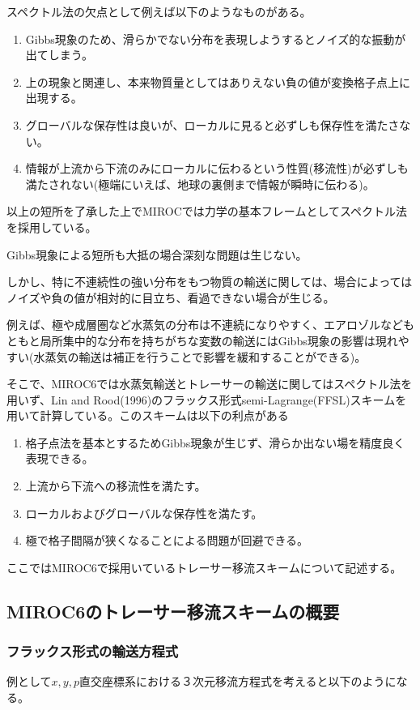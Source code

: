 \documentclass{jsbook}
\begin{document}
スペクトル法の欠点として例えば以下のようなものがある。
\begin{enumerate}
\item Gibbs現象のため、滑らかでない分布を表現しようするとノイズ的な振動が出てしまう。
\item 上の現象と関連し、本来物質量としてはありえない負の値が変換格子点上に出現する。
\item グローバルな保存性は良いが、ローカルに見ると必ずしも保存性を満たさない。
\item 情報が上流から下流のみにローカルに伝わるという性質(移流性)が必ずしも満たされない(極端にいえば、地球の裏側まで情報が瞬時に伝わる)。
\end{enumerate}
以上の短所を了承した上でMIROCでは力学の基本フレームとしてスペクトル法を採用している。

Gibbs現象による短所も大抵の場合深刻な問題は生じない。

しかし、特に不連続性の強い分布をもつ物質の輸送に関しては、場合によってはノイズや負の値が相対的に目立ち、看過できない場合が生じる。

例えば、極や成層圏など水蒸気の分布は不連続になりやすく、エアロゾルなどもともと局所集中的な分布を持ちがちな変数の輸送にはGibbs現象の影響は現れやすい(水蒸気の輸送は補正を行うことで影響を緩和することができる)。

そこで、MIROC6では水蒸気輸送とトレーサーの輸送に関してはスペクトル法を用いず、Lin and Rood(1996)のフラックス形式semi-Lagrange(FFSL)スキームを用いて計算している。このスキームは以下の利点がある
\begin{enumerate}
\item 格子点法を基本とするためGibbs現象が生じず、滑らか出ない場を精度良く表現できる。
\item 上流から下流への移流性を満たす。
\item ローカルおよびグローバルな保存性を満たす。
\item 極で格子間隔が狭くなることによる問題が回避できる。
\end{enumerate}
ここではMIROC6で採用いているトレーサー移流スキームについて記述する。

\subsection{MIROC6のトレーサー移流スキームの概要}
\subsubsection{フラックス形式の輸送方程式}
例として$x,y,p$直交座標系における３次元移流方程式を考えると以下のようになる。
\end{document}
